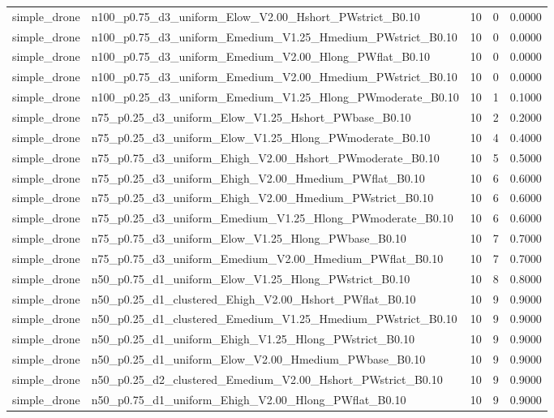 \begin{tabular}{llrrr}
simple_drone & n100_p0.75_d3_uniform_Elow_V2.00_Hshort_PWstrict_B0.10 & 10 & 0 & 0.0000 \\
simple_drone & n100_p0.75_d3_uniform_Emedium_V1.25_Hmedium_PWstrict_B0.10 & 10 & 0 & 0.0000 \\
simple_drone & n100_p0.75_d3_uniform_Emedium_V2.00_Hlong_PWflat_B0.10 & 10 & 0 & 0.0000 \\
simple_drone & n100_p0.75_d3_uniform_Emedium_V2.00_Hmedium_PWstrict_B0.10 & 10 & 0 & 0.0000 \\
simple_drone & n100_p0.25_d3_uniform_Emedium_V1.25_Hlong_PWmoderate_B0.10 & 10 & 1 & 0.1000 \\
simple_drone & n75_p0.25_d3_uniform_Elow_V1.25_Hshort_PWbase_B0.10 & 10 & 2 & 0.2000 \\
simple_drone & n75_p0.25_d3_uniform_Elow_V1.25_Hlong_PWmoderate_B0.10 & 10 & 4 & 0.4000 \\
simple_drone & n75_p0.75_d3_uniform_Ehigh_V2.00_Hshort_PWmoderate_B0.10 & 10 & 5 & 0.5000 \\
simple_drone & n75_p0.25_d3_uniform_Ehigh_V2.00_Hmedium_PWflat_B0.10 & 10 & 6 & 0.6000 \\
simple_drone & n75_p0.25_d3_uniform_Ehigh_V2.00_Hmedium_PWstrict_B0.10 & 10 & 6 & 0.6000 \\
simple_drone & n75_p0.25_d3_uniform_Emedium_V1.25_Hlong_PWmoderate_B0.10 & 10 & 6 & 0.6000 \\
simple_drone & n75_p0.75_d3_uniform_Elow_V1.25_Hlong_PWbase_B0.10 & 10 & 7 & 0.7000 \\
simple_drone & n75_p0.75_d3_uniform_Emedium_V2.00_Hmedium_PWflat_B0.10 & 10 & 7 & 0.7000 \\
simple_drone & n50_p0.75_d1_uniform_Elow_V1.25_Hlong_PWstrict_B0.10 & 10 & 8 & 0.8000 \\
simple_drone & n50_p0.25_d1_clustered_Ehigh_V2.00_Hshort_PWflat_B0.10 & 10 & 9 & 0.9000 \\
simple_drone & n50_p0.25_d1_clustered_Emedium_V1.25_Hmedium_PWstrict_B0.10 & 10 & 9 & 0.9000 \\
simple_drone & n50_p0.25_d1_uniform_Ehigh_V1.25_Hlong_PWstrict_B0.10 & 10 & 9 & 0.9000 \\
simple_drone & n50_p0.25_d1_uniform_Elow_V2.00_Hmedium_PWbase_B0.10 & 10 & 9 & 0.9000 \\
simple_drone & n50_p0.25_d2_clustered_Emedium_V2.00_Hshort_PWstrict_B0.10 & 10 & 9 & 0.9000 \\
simple_drone & n50_p0.75_d1_uniform_Ehigh_V2.00_Hlong_PWflat_B0.10 & 10 & 9 & 0.9000 \\

\end{tabular}
